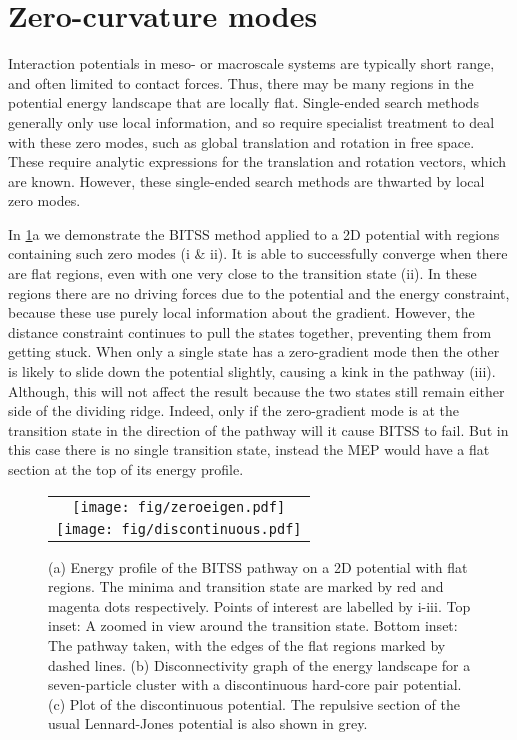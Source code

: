 \documentclass[aps,twocolumn]{revtex4}
\begin{document}
\section{Zero-curvature modes}
\topic Interaction potentials in meso- or macroscale systems are typically short range, and often limited to contact forces.
Thus, there may be many regions in the potential energy landscape that are locally flat.
Single-ended search methods generally only use local information, and so require specialist treatment to deal with these zero modes, such as global translation and rotation in free space.
These require analytic expressions for the translation and rotation vectors, which are known.
However, these single-ended search methods are thwarted by local zero modes.

\topic In \cref{fig:flatdiscontinuous}a we demonstrate the BITSS method applied to a 2D potential with regions containing such zero modes (i \& ii).
It is able to successfully converge when there are flat regions, even with one very close to the transition state (ii).
In these regions there are no driving forces due to the potential and the energy constraint, because these use purely local information about the gradient.
However, the distance constraint continues to pull the states together, preventing them from getting stuck.
When only a single state has a zero-gradient mode then the other is likely to slide down the potential slightly, causing a kink in the pathway (iii).
Although, this will not affect the result because the two states still remain either side of the dividing ridge.
Indeed, only if the zero-gradient mode is at the transition state in the direction of the pathway will it cause BITSS to fail.
But in this case there is no single transition state, instead the MEP would have a flat section at the top of its energy profile.


\begin{figure}[htb]
  \centering
  \begin{tabular}[b]{c}
    \texttt{[image: fig/zeroeigen.pdf]}\\
    \texttt{[image: fig/discontinuous.pdf]}
  \end{tabular}
  \caption{
    (a) Energy profile of the BITSS pathway on a 2D potential with flat regions.
        The minima and transition state are marked by red and magenta dots respectively.
        Points of interest are labelled by i-iii.
        Top inset: A zoomed in view around the transition state.
        Bottom inset: The pathway taken, with the edges of the flat regions marked by dashed lines.
    (b) Disconnectivity graph of the energy landscape for a seven-particle cluster with a discontinuous hard-core pair potential.
    (c) Plot of the discontinuous potential.
        The repulsive section of the usual Lennard-Jones potential is also shown in grey.
  }
  \label{fig:flatdiscontinuous}
\end{figure}
\end{document}
